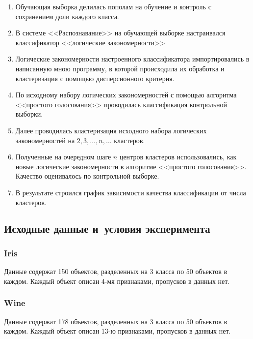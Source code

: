 \documentclass[12pt]{article}
\begin{document}
\begin{enumerate}
  \item Обучающая выборка делилась пополам на обучение и контроль с
    сохранением доли каждого класса.
  \item В системе <<Распознавание>> на обучающей выборке настраивался
    классификатор <<логические закономерности>>
  \item Логические закономерности настроенного классификатора
    импортировались в написанную мною программу, в которой происходила
    их обработка и кластеризация с помощью дисперсионного критерия.
  \item По исходному набору логических закономерностей с помощью
    алгоритма <<простого голосования>> \cite{voron10logicalgs}
    проводилась классификация контрольной выборки.
  \item Далее проводилась кластеризация исходного набора логических
    закономерностей на \(2, 3, \dots, n, \dots\) кластеров.
  \item Полученные на очередном шаге \(n\) центров кластеров
    использовались, как новые логические закономерности в алгоритме
    <<простого голосования>>. Качество оценивалось по контрольной
    выборке.
  \item В результате строился график зависимости качества
    классификации от числа кластеров.
\end{enumerate}

\subsection{Исходные данные и~условия эксперимента}

\subsubsection{Iris}
Данные содержат 150 объектов, разделенных на 3 класса по 50 объектов в
каждом. Каждый объект описан 4-мя признаками, пропусков в данных нет.

\subsubsection{Wine}
Данные содержат 178 объектов, разделенных на 3 класса по 50 объектов в
каждом. Каждый объект описан 13-ю признаками, пропусков в данных нет.
\end{document}
